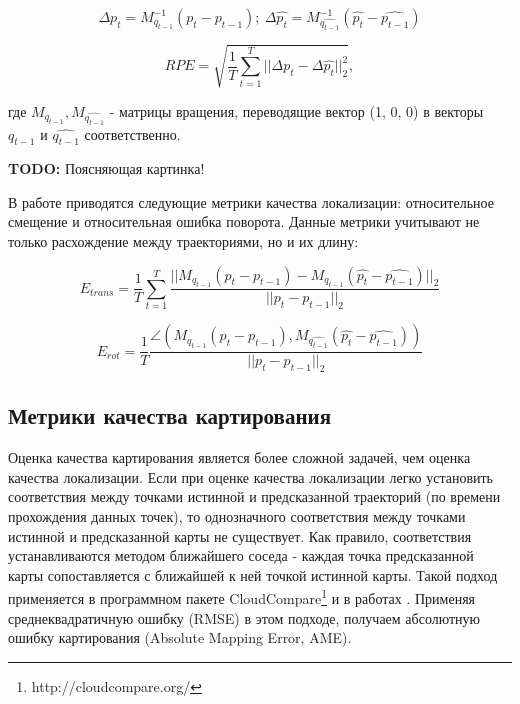\documentclass{mipt-thesis-ms}
\begin{document}
	$$\Delta p_t = M_{q_{t-1}}^{-1} (p_t - p_{t-1});\ \Delta \widehat{p_t} = M_{\widehat{q_{t-1}}}^{-1} (\widehat{p_t} - \widehat{p_{t-1}})$$
	
	\begin{equation}
	\label{eq_rpe}
	RPE = \sqrt{\frac{1}{T} \sum_{t=1}^T ||\Delta p_t - \Delta \widehat{p_t} ||_2^2},
	\end{equation}
	
	где $M_{q_{t-1}}, M_{\widehat{q_{t-1}}}$ - матрицы вращения, переводящие вектор (1, 0, 0) в векторы $q_{t-1}$ и $\widehat{q_{t-1}}$ соответственно.
	
	\textbf{TODO:} Поясняющая картинка!
	
	В работе \cite{geiger2012we} приводятся следующие метрики качества локализации: относительное смещение и относительная ошибка поворота. Данные метрики учитывают не только расхождение между траекториями, но и их длину:
	
	\begin{equation}
	\label{eq_etrans}
	E_{trans} = \frac{1}{T} \sum\limits_{t=1}^T \frac{|| M_{q_{t-1}} (p_t - p_{t-1}) - M_{\widehat{q_{t-1}}} (\widehat{p_t} - \widehat{p_{t-1}}) ||_2}{|| p_t - p_{t-1} ||_2}
	\end{equation}
	
	\begin{equation}
	\label{eq_erot}
	E_{rot} = \frac{1}{T} \frac{\angle(M_{q_{t-1}} (p_t - p_{t-1}), M_{\widehat{q_{t-1}}} (\widehat{p_t} - \widehat{p_{t-1}}))}{|| p_t - p_{t-1} ||_2}
	\end{equation}
	
	\subsection{Метрики качества картирования}
	
	Оценка качества картирования является более сложной задачей, чем оценка качества локализации. Если при оценке качества локализации легко установить соответствия между точками истинной и предсказанной траекторий (по времени прохождения данных точек), то однозначного соответствия между точками истинной и предсказанной карты не существует. Как правило, соответствия устанавливаются методом ближайшего соседа - каждая точка предсказанной карты сопоставляется с ближайшей к ней точкой истинной карты. Такой подход применяется в программном пакете CloudCompare\footnote{http://cloudcompare.org/} и в работах \cite{handa2014benchmark}\cite{wasenmuller2016corbs}. Применяя среднеквадратичную ошибку (RMSE) в этом подходе, получаем абсолютную ошибку картирования (Absolute Mapping Error, AME).
	
\end{document}
